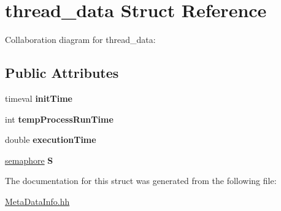 \hypertarget{structthread__data}{}\section{thread\+\_\+data Struct Reference}
\label{structthread__data}


Collaboration diagram for thread\+\_\+data\+:
\subsection*{Public Attributes}
\begin{DoxyCompactItemize}
\item 
timeval {\bfseries init\+Time}\hypertarget{structthread__data_a70f378a618101aab4d9fe8e41d820674}{}\label{structthread__data_a70f378a618101aab4d9fe8e41d820674}

\item 
int {\bfseries temp\+Process\+Run\+Time}\hypertarget{structthread__data_a191cbc39e2ec8ab190cc8566f9a1662c}{}\label{structthread__data_a191cbc39e2ec8ab190cc8566f9a1662c}

\item 
double {\bfseries execution\+Time}\hypertarget{structthread__data_a6242a266249dff45708a3c45a7a54b9b}{}\label{structthread__data_a6242a266249dff45708a3c45a7a54b9b}

\item 
\hyperlink{structsemaphore}{semaphore} {\bfseries S}\hypertarget{structthread__data_add8dbe169a789c195946c30014cdfe00}{}\label{structthread__data_add8dbe169a789c195946c30014cdfe00}

\end{DoxyCompactItemize}


The documentation for this struct was generated from the following file\+:\begin{DoxyCompactItemize}
\item 
\hyperlink{_meta_data_info_8hh}{Meta\+Data\+Info.\+hh}\end{DoxyCompactItemize}
